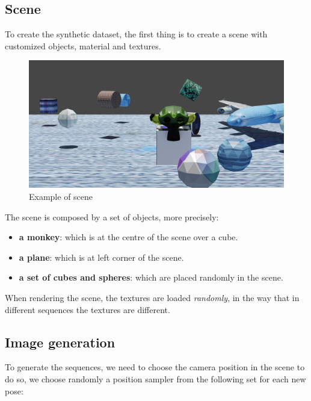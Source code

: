 \subsection{Scene}\label{subsec:scene}
To create the synthetic dataset, the first thing is to create a scene with customized objects, material and textures.
\begin{figure}[H]
    \centering
    \includegraphics[width=\textwidth]{images/3_example_of_scene}
    \caption{Example of scene}\label{fig:example-of-scene}
\end{figure}
The scene is composed by a set of objects, more precisely:
\begin{itemize}
    \item \textbf{a monkey}: which is at the centre of the scene over a cube.
    \item \textbf{a plane}: which is at left corner of the scene.
    \item \textbf{a set of cubes and spheres}: which are placed randomly in the scene.
\end{itemize}

When rendering the scene, the textures are loaded \textit{randomly}, in the way that in different sequences the textures are different.
\subsection{Image generation}\label{subsec:image-generation}
To generate the sequences, we need to choose the camera position in the scene to do so, we choose randomly a position sampler from the following set for each new pose:

